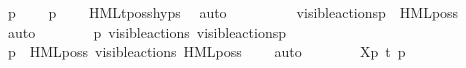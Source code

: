 \begin{isabellebody}
\ {\isacartoucheopen}p{\isacharprime}{\kern0pt}\ {\isasymTTurnstile}\ {\isasymphi}{\isacartoucheclose}\ \isamarkupfalse%
\ {\isacartoucheopen}{\isasymtheta}{\isacharparenleft}{\kern0pt}p{\isacharprime}{\kern0pt}{\isacharparenright}{\kern0pt}\ {\isasymTurnstile}\ {\isasymsigma}{\isacharparenleft}{\kern0pt}{\isasymphi}{\isacharparenright}{\kern0pt}{\isacartoucheclose}\ \isamarkupfalse%
\ HMLt{\isacharunderscore}{\kern0pt}poss{\isachardot}{\kern0pt}hyps\ \isamarkupfalse%
\ auto\isanewline
\ \ \ \ \ \ \isamarkupfalse%
\ \isamarkupfalse%
\ {\isacartoucheopen}{\isasymtheta}{\isacharbrackleft}{\kern0pt}visible{\isacharunderscore}{\kern0pt}actions{\isacharbrackright}{\kern0pt}{\isacharparenleft}{\kern0pt}p{\isacharparenright}{\kern0pt}\ {\isasymTurnstile}\ HML{\isacharunderscore}{\kern0pt}poss\ {\isasymalpha}\ {\isasymsigma}{\isacharparenleft}{\kern0pt}{\isasymphi}{\isacharparenright}{\kern0pt}{\isacartoucheclose}\ \isamarkupfalse%
\ auto\isanewline
\isanewline
\ \ \ \ \ \ \isamarkupfalse%
\ {\isacartoucheopen}{\isasymtheta}{\isacharparenleft}{\kern0pt}p{\isacharparenright}{\kern0pt}\ {\isasymlongmapsto}\isactrlsup {\isasymtheta}{\isasymepsilon}{\isacharbrackleft}{\kern0pt}visible{\isacharunderscore}{\kern0pt}actions{\isacharbrackright}{\kern0pt}\ {\isasymtheta}{\isacharbrackleft}{\kern0pt}visible{\isacharunderscore}{\kern0pt}actions{\isacharbrackright}{\kern0pt}{\isacharparenleft}{\kern0pt}p{\isacharparenright}{\kern0pt}{\isacartoucheclose}\isanewline
\ \ \ \ \ \ \isamarkupfalse%
\ {\isacartoucheopen}{\isasymtheta}{\isacharparenleft}{\kern0pt}p{\isacharparenright}{\kern0pt}\ {\isasymTurnstile}\ HML{\isacharunderscore}{\kern0pt}poss\ {\isacharparenleft}{\kern0pt}{\isasymepsilon}{\isacharbrackleft}{\kern0pt}visible{\isacharunderscore}{\kern0pt}actions{\isacharbrackright}{\kern0pt}{\isacharparenright}{\kern0pt}\ {\isacharparenleft}{\kern0pt}HML{\isacharunderscore}{\kern0pt}poss\ {\isasymalpha}\ {\isasymsigma}{\isacharparenleft}{\kern0pt}{\isasymphi}{\isacharparenright}{\kern0pt}{\isacharparenright}{\kern0pt}{\isacartoucheclose}\ \isamarkupfalse%
\ auto\isanewline
\isanewline
\ \ \ \ \ \ \isamarkupfalse%
\ {\isacartoucheopen}{\isasymtheta}{\isacharbrackleft}{\kern0pt}X{\isacharbrackright}{\kern0pt}{\isacharparenleft}{\kern0pt}p{\isacharparenright}{\kern0pt}\ {\isasymlongmapsto}\isactrlsup {\isasymtheta}t{\isacharunderscore}{\kern0pt}{\isasymepsilon}\ {\isasymtheta}{\isacharparenleft}{\kern0pt}p{\isacharparenright}{\kern0pt}{\isacartoucheclose}\isanewline

\end{isabellebody}
